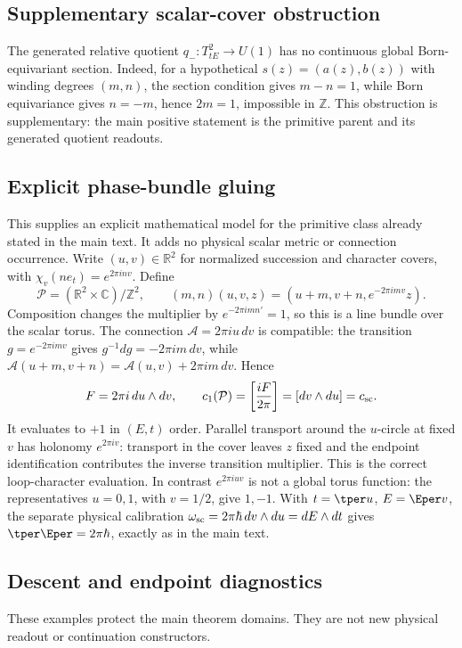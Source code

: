 \documentclass[11pt,a4paper]{article}
\begin{document}
\subsection{Supplementary scalar-cover obstruction}
\label{p3a:app:v190-scalar-cover-obstruction}
The generated relative quotient $q_-:T^2_{tE}\to U(1)$ has no continuous
global Born-equivariant section.  Indeed, for a hypothetical
$s(z)=(a(z),b(z))$ with winding degrees $(m,n)$, the section condition gives
$m-n=1$, while Born equivariance gives $n=-m$, hence $2m=1$, impossible in
$\mathbb Z$.  This obstruction is supplementary: the main positive statement
is the primitive parent and its generated quotient readouts.

\subsection{Explicit phase-bundle gluing}
\label{p3a:app:v166-phase-gluing}
This supplies an explicit mathematical model for the primitive class already
stated in the main text. It adds no physical scalar metric or connection
occurrence. Write \((u,v)\in\mathbb R^2\) for normalized succession and
character covers, with \(\chi_v(ne_t)=e^{2\pi inv}\). Define
\[
 \mathcal P=(\mathbb R^2\times\mathbb C)/\mathbb Z^2,\qquad
 (m,n)(u,v,z)=(u+m,v+n,e^{-2\pi imv}z).
\]
Composition changes the multiplier by \(e^{-2\pi imn'}=1\), so this is a
line bundle over the scalar torus. The connection
\(\mathcal A=2\pi i u\,dv\) is compatible: the transition
\(g=e^{-2\pi imv}\) gives \(g^{-1}dg=-2\pi im\,dv\), while
\(\mathcal A(u+m,v+n)=\mathcal A(u,v)+2\pi im\,dv\). Hence
\[
 F=2\pi i\,du\wedge dv,\qquad
 c_1(\mathcal P)=\left[\frac{iF}{2\pi}\right]=[dv\wedge du]=c_{\rm sc}.
\]
It evaluates to \(+1\) in \((E,t)\) order. Parallel transport around
the \(u\)-circle at fixed \(v\) has holonomy \(e^{2\pi iv}\): transport
in the cover leaves \(z\) fixed and the endpoint identification contributes
the inverse transition multiplier. This is the correct loop-character
evaluation. In contrast \(e^{2\pi iuv}\) is not a global torus function:
the representatives \(u=0,1\), with \(v=1/2\), give \(1,-1\).
With \(t=\tper u\), \(E=\Eper v\), the separate physical calibration
\(\omega_{\rm sc}=2\pi\hbar\,dv\wedge du=dE\wedge dt\) gives
\(\tper\Eper=2\pi\hbar\), exactly as in the main text.

\subsection{Descent and endpoint diagnostics}
\label{p3a:app:v166-descent-diagnostics}
These examples protect the main theorem domains. They are not new physical
readout or continuation constructors.
\end{document}
